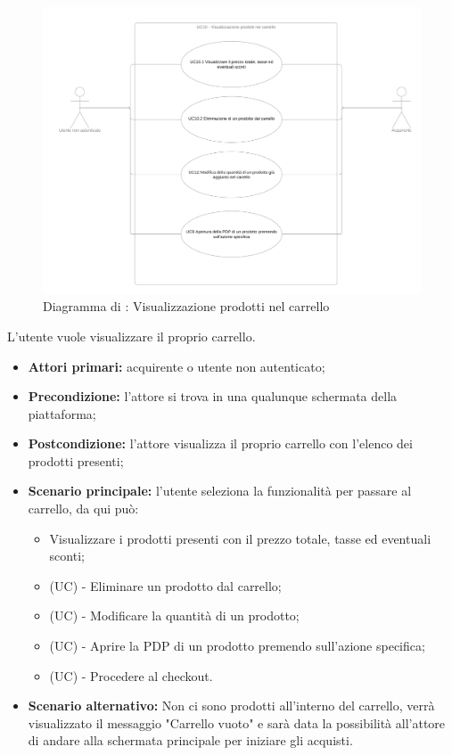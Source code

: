 \begin{figure}[H]
    \centering
    \includegraphics[width=\textwidth]{Immagini/DiagrammiUC/UC10VisualizzazioneProdottiNelCarrello.png}
    \caption{Diagramma di \actualUC: Visualizzazione prodotti nel carrello} 
    \label{fig:VisualizzazioneProdottiNelCarrello}
\end{figure}
L'utente vuole visualizzare il proprio carrello.
\begin{itemize}
    \item \textbf{Attori primari:} acquirente o utente non autenticato;
    \item \textbf{Precondizione:} l'attore si trova in una qualunque schermata della piattaforma;
    \item \textbf{Postcondizione:} l'attore visualizza il proprio carrello con l'elenco dei prodotti presenti;
    \item \textbf{Scenario principale:} l'utente seleziona la funzionalità per passare al carrello, da qui può:
    \begin{itemize}
        \item Visualizzare i prodotti presenti con il prezzo totale, tasse ed eventuali sconti;
        \item (UC) - Eliminare un prodotto dal carrello;
        \item (UC) - Modificare la quantità di un prodotto;
        \item (UC) - Aprire la PDP di un prodotto premendo sull'azione specifica;
        \item (UC) - Procedere al checkout.
    \end{itemize}
    \item \textbf{Scenario alternativo:} Non ci sono prodotti all'interno del carrello, verrà visualizzato il messaggio "Carrello vuoto" e sarà data la possibilità all'attore di andare alla schermata principale per iniziare gli acquisti.
\end{itemize}

